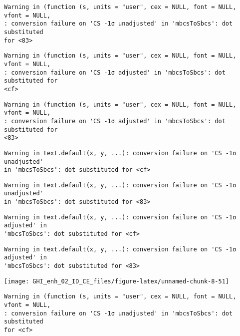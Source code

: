 \documentclass[
  10pt,
  a4paper,oneside]{article}
\begin{document}
\begin{verbatim}
Warning in (function (s, units = "user", cex = NULL, font = NULL, vfont = NULL,
: conversion failure on 'CS -1σ unadjusted' in 'mbcsToSbcs': dot substituted
for <83>
\end{verbatim}

\begin{verbatim}
Warning in (function (s, units = "user", cex = NULL, font = NULL, vfont = NULL,
: conversion failure on 'CS -1σ adjusted' in 'mbcsToSbcs': dot substituted for
<cf>
\end{verbatim}

\begin{verbatim}
Warning in (function (s, units = "user", cex = NULL, font = NULL, vfont = NULL,
: conversion failure on 'CS -1σ adjusted' in 'mbcsToSbcs': dot substituted for
<83>
\end{verbatim}

\begin{verbatim}
Warning in text.default(x, y, ...): conversion failure on 'CS -1σ unadjusted'
in 'mbcsToSbcs': dot substituted for <cf>
\end{verbatim}

\begin{verbatim}
Warning in text.default(x, y, ...): conversion failure on 'CS -1σ unadjusted'
in 'mbcsToSbcs': dot substituted for <83>
\end{verbatim}

\begin{verbatim}
Warning in text.default(x, y, ...): conversion failure on 'CS -1σ adjusted' in
'mbcsToSbcs': dot substituted for <cf>
\end{verbatim}

\begin{verbatim}
Warning in text.default(x, y, ...): conversion failure on 'CS -1σ adjusted' in
'mbcsToSbcs': dot substituted for <83>
\end{verbatim}

\begin{center}\texttt{[image: GHI\_enh\_02\_ID\_CE\_files/figure-latex/unnamed-chunk-8-51]} \end{center}

\begin{verbatim}
Warning in (function (s, units = "user", cex = NULL, font = NULL, vfont = NULL,
: conversion failure on 'CS -1σ unadjusted' in 'mbcsToSbcs': dot substituted
for <cf>
\end{verbatim}
\end{document}
